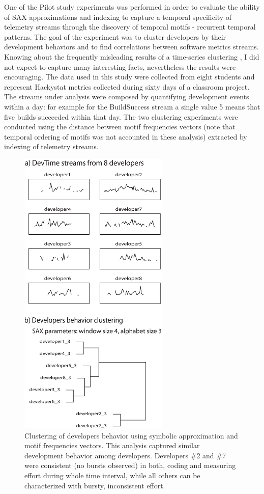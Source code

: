 \documentclass{sig-alternate}
\begin{document}
One of the Pilot study experiments was performed in order to evaluate the ability of SAX approximations and indexing to capture a temporal specificity of telemetry streams through the discovery of temporal motifs - recurrent temporal patterns. The goal of the experiment was to cluster developers by their development behaviors and to find correlations between software metrics streams. Knowing about the frequently misleading results of a time-series clustering \cite{citeulike:227029}, I did not expect to capture many interesting facts, nevertheless the results were encouraging. The data used in this study were collected from eight students and represent Hackystat metrics collected during sixty days of a classroom project. The streams under analysis were composed by quantifying development events within a day: for example for the BuildSuccess stream a single value 5 means that five builds succeeded within that day. The two clustering experiments were conducted using the distance between motif frequencies vectors (note that temporal ordering of motifs was not accounted in these analysis) extracted by indexing of telemetry streams.

\begin{figure}[htpb]
   \centering
   \includegraphics[height=140mm]{dev_clustering_vertical.eps}
   \caption{Clustering of developers behavior using symbolic approximation and motif frequencies vectors. This analysis captured similar development behavior among developers. Developers \#2 and \#7 were consistent (no bursts observed) in both, coding and measuring effort during whole time interval, while all others can be characterized with bursty, inconsistent effort.}
   \label{fig:cluster_developers}
\end{figure}
\end{document}
